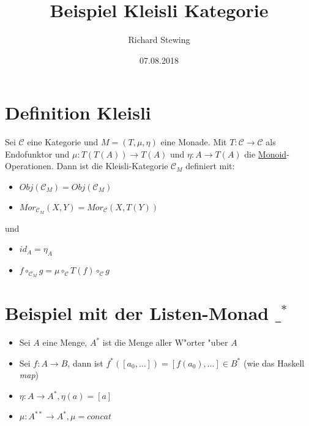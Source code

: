 \documentclass[11pt]{article}
\author{Richard Stewing}
\date{07.08.2018}
\title{Beispiel Kleisli Kategorie}
\begin{document}
\maketitle

\section{Definition Kleisli}
\label{sec-1}

Sei $\mathcal{C}$ eine Kategorie und $M=(T, \mu, \eta)$ eine Monade. 
Mit $T: \mathcal{C} \to \mathcal{C}$ als Endofunktor und 
$\mu: T(T(A)) \to T(A)$ und $\eta: A \to T(A)$ die \href{https://de.wikipedia.org/wiki/Monoid}{Monoid}-Operationen.
Dann ist die Kleisli-Kategorie $\mathcal{C}_M$ definiert mit:
\begin{itemize}
\item $Obj(\mathcal{C}_M) = Obj(\mathcal{C}_M)$
\item $Mor_{\mathcal{C}_M}(X,Y) = Mor_{\mathcal{C}}(X, T(Y))$
\end{itemize}
und 
\begin{itemize}
\item $id_A = \eta_A$
\item $f \circ_{\mathcal{C}_M} g = \mu \circ_{\mathcal{C}} T(f) \circ_{\mathcal{C}} g$
\end{itemize}

\section{Beispiel mit der Listen-Monad $\_^*$}
\label{sec-2}
\begin{itemize}
\item Sei $A$ eine Menge, $A^*$ ist die Menge aller W"orter "uber $A$
\item Sei $f:A \to B$, dann ist $f^*([a_0,\dots]) = [f(a_0),\dots] \in B^*$ (wie das Haskell \emph{map})
\item $\eta:A \to A^*, \eta(a) = [a]$
\item $\mu: A^{**} \to A^*, \mu = concat$
\end{itemize}
\end{document}
